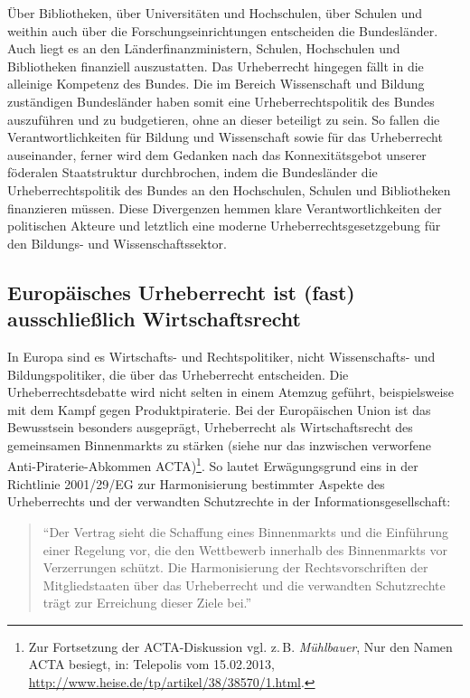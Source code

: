 \documentclass[output=paper]{langscibook}
\begin{document}
Über Bibliotheken, über Universitäten und Hochschulen, über Schulen und
weithin auch über die Forschungseinrichtungen entscheiden die
Bundesländer. Auch liegt es an den Länderfinanzministern, Schulen,
Hochschulen und Bibliotheken finanziell auszustatten. Das Urheberrecht
hingegen fällt in die alleinige Kompetenz des Bundes. Die im Bereich
Wissenschaft und Bildung zuständigen Bundesländer haben somit eine
Urheberrechtspolitik des Bundes auszuführen und zu budgetieren, ohne an
dieser beteiligt zu sein. So fallen die Verantwortlichkeiten für Bildung
und Wissenschaft sowie für das Urheberrecht auseinander, ferner wird dem
Gedanken nach das Konnexitätsgebot unserer föderalen Staatstruktur
durchbrochen, indem die Bundesländer die Urheberrechtspolitik des Bundes
an den Hochschulen, Schulen und Bibliotheken finanzieren müssen. Diese
Divergenzen hemmen klare Verantwortlichkeiten der politischen Akteure
und letztlich eine moderne Urheberrechtsgesetzgebung für den Bildungs-
und Wissenschaftssektor.

\hypertarget{europuxe4isches-urheberrecht-ist-fast-ausschlieuxdflich-wirtschaftsrecht}{%
\subsection{Europäisches Urheberrecht ist (fast) ausschließlich
Wirtschaftsrecht}\label{europuxe4isches-urheberrecht-ist-fast-ausschlieuxdflich-wirtschaftsrecht}}

In Europa sind es Wirtschafts- und Rechtspolitiker, nicht Wissenschafts-
und Bildungspolitiker, die über das Urheberrecht entscheiden. Die
Urheberrechtsdebatte wird nicht selten in einem Atemzug geführt,
beispielsweise mit dem Kampf gegen Produktpiraterie. Bei der
Europäischen Union ist das Bewusstsein besonders ausgeprägt,
Urheberrecht als Wirtschaftsrecht des gemeinsamen Binnenmarkts zu
stärken (siehe nur das inzwischen verworfene Anti-Piraterie-Abkommen
ACTA)\footnote{Zur Fortsetzung der ACTA-Diskussion vgl. z.\,B.
  \emph{Mühlbauer}, Nur den Namen ACTA besiegt, in: Telepolis vom
  15.02.2013, \url{http://www.heise.de/tp/artikel/38/38570/1.html}.}. So
lautet Erwägungsgrund eins in der Richtlinie 2001/29/EG zur
Harmonisierung bestimmter Aspekte des Urheberrechts und der verwandten
Schutzrechte in der Informationsgesellschaft:

\begin{quote}
\enquote{Der Vertrag sieht die Schaffung eines Binnenmarkts und die
Einführung einer Regelung vor, die den Wettbewerb innerhalb des
Binnenmarkts vor Verzerrungen schützt. Die Harmonisierung der
Rechtsvorschriften der Mitgliedstaaten über das Urheberrecht und die
verwandten Schutzrechte trägt zur Erreichung dieser Ziele bei.}
\end{quote}
\end{document}
